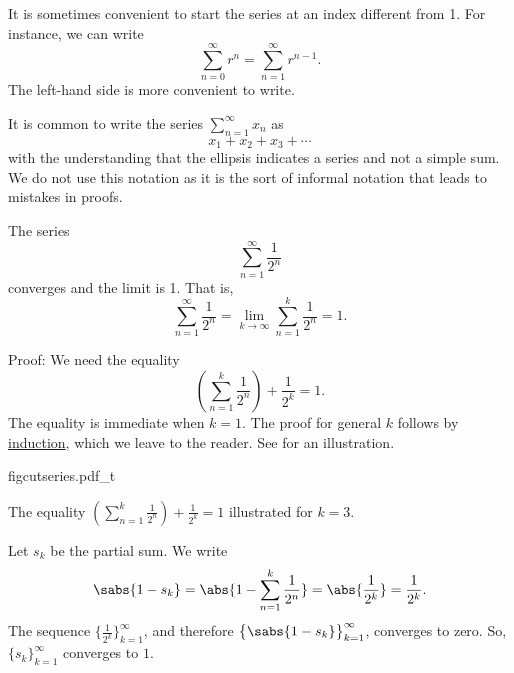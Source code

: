 \begin{remark}
It is sometimes convenient to start
the series at an index different from 1.  For instance, we can write
\begin{equation*}
\sum_{n=0}^\infty r^n = \sum_{n=1}^\infty r^{n-1} .
\end{equation*}
The left-hand side is more convenient to write.
\end{remark}

\begin{remark}
It is common to write the series $\sum_{n=1}^\infty x_n$ as
\begin{equation*}
x_1 + x_2 + x_3 + \cdots
\end{equation*}
with the understanding that the ellipsis indicates a series and
not a simple sum.  We do not use this notation as it is the sort of informal
notation that leads to mistakes in proofs.
\end{remark}

\begin{example}
The series
\begin{equation*}
\sum_{n=1}^\infty \frac{1}{2^n}
\end{equation*}
converges and the limit is 1.  That is,
\begin{equation*}
\sum_{n=1}^\infty \frac{1}{2^n} = 
\lim_{k\to\infty} \sum_{n=1}^k \frac{1}{2^n} = 
1 .
\end{equation*}

Proof: We need the equality
\begin{equation*}
\left( \sum_{n=1}^k \frac{1}{2^n} \right)
+ \frac{1}{2^k}
= 1 .
\end{equation*}
The equality is immediate when $k=1$.  The proof for general $k$
follows by \hyperref[induction:thm]{induction}, which we leave to the
reader.  See  for an illustration.
\begin{myfigureht}
{figcutseries.pdf_t}
\caption{The equality 
$\left( \sum_{n=1}^k \frac{1}{2^n} \right)
+ \frac{1}{2^k}
= 1$ illustrated for $k=3$.\label{figcutseries}}
\end{myfigureht}

Let $s_k$ be the partial sum.  We write
\begin{equation*}
\sabs{
1 - s_k 
}
=
\abs{
1 - 
\sum_{n=1}^k \frac{1}{2^n}
}
=
\abs{\frac{1}{2^k}} = 
\frac{1}{2^k} .
\end{equation*}
The sequence $\bigl\{ \frac{1}{2^k} \bigr\}_{k=1}^\infty$, and
therefore $\bigl\{ \sabs{1-s_k} \bigr\}_{k=1}^\infty$,
converges to zero.  So, $\{ s_k \}_{k=1}^\infty$ converges to $1$.
\end{example}

